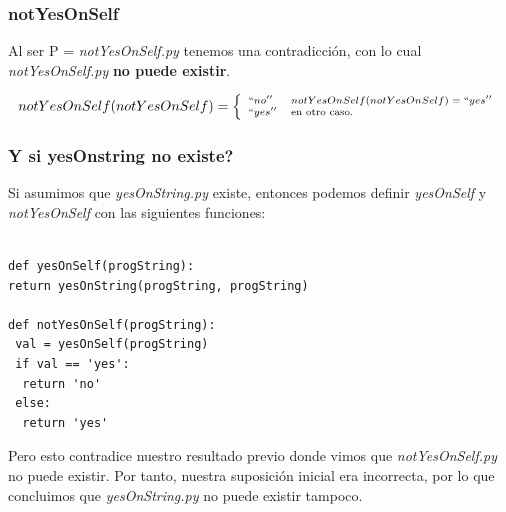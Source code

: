 \documentclass[xcolor=table]{beamer}
\begin{document}
\begin{frame}  \frametitle{notYesOnSelf}  \footnotesize  


Al ser P = \textit{notYesOnSelf.py} tenemos una contradicción, con lo cual \textit{notYesOnSelf.py} \large{\textbf{no puede existir}}.
\begin{center}
\begin{equation}\scriptsize  
     \label{eq:notYesOnSelf}
     notYesOnSelf (notYesOnSelf) =  \left\{
	       \begin{array}{ll}
		 ``no''      & notYesOnSelf (notYesOnSelf) = ``yes'' \\
		 ``yes''     & \text{en otro caso.} \\
	       \end{array}
	     \right.
   \end{equation}
\end{center}
\end{frame} 



\begin{frame}[fragile]\frametitle{Y si yesOnstring no existe?}  \scriptsize  

Si asumimos que \textit{yesOnString.py} existe, entonces podemos definir \textit{yesOnSelf} y \textit{notYesOnSelf} con las siguientes funciones:

 
 \begin{verbatim}

def yesOnSelf(progString):
return yesOnString(progString, progString)

def notYesOnSelf(progString):
 val = yesOnSelf(progString)
 if val == 'yes':
  return 'no'
 else:
  return 'yes'
\end{verbatim}    

Pero esto contradice nuestro resultado previo donde vimos que  \textit{notYesOnSelf.py} no puede existir. Por tanto, nuestra suposición inicial era incorrecta, por lo que concluimos que
\textit{yesOnString.py} no puede existir tampoco.

\end{frame} 
\end{document}
